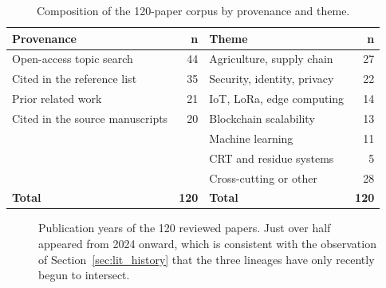 \documentclass[12pt,a4paper,oneside]{book}
\begin{document}
\begin{table}[htbp]
  \centering
  \caption{Composition of the 120-paper corpus by provenance and theme.}
  \label{tab:corpus}
  \begin{singlespace}
  \small
  \begin{tabular}{@{}p{5.6cm}r@{\hskip 12mm}p{4.6cm}r@{}}
    \toprule
    \textbf{Provenance} & \textbf{n} & \textbf{Theme} & \textbf{n} \\
    \midrule
    Open-access topic search        & 44 & Agriculture, supply chain   & 27 \\
    Cited in the reference list     & 35 & Security, identity, privacy & 22 \\
    Prior related work              & 21 & IoT, LoRa, edge computing   & 14 \\
    Cited in the source manuscripts & 20 & Blockchain scalability      & 13 \\
                                    &    & Machine learning            & 11 \\
                                    &    & CRT and residue systems     &  5 \\
                                    &    & Cross-cutting or other      & 28 \\
    \midrule
    \textbf{Total}                  & \textbf{120} & \textbf{Total}     & \textbf{120} \\
    \bottomrule
  \end{tabular}
  \end{singlespace}
\end{table}

\begin{figure}[htbp]
  \centering
  \caption{Publication years of the 120 reviewed papers. Just over half appeared
           from 2024 onward, which is consistent with the observation of
           Section~\ref{sec:lit_history} that the three lineages have only
           recently begun to intersect.}
  \label{fig:corpus-year}
\end{figure}
\end{document}
